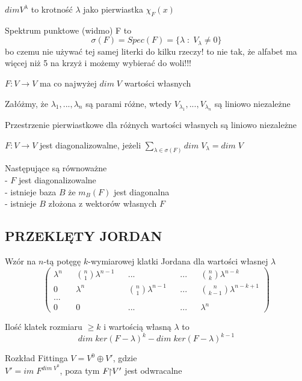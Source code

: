\documentclass{article}
\begin{document}
\begin{multicols*}{2}
    $dim V^\lambda$ to krotność $\lambda$ jako pierwiastka $\chi_F(x)$

    {\color{def}Spektrum punktowe} (widmo) F to
    $$\sigma(F)=Spec(F)=\{\lambda\;:\;V_\lambda\neq 0\}$$
    bo czemu nie używać tej samej literki do kilku rzeczy! to nie tak, że alfabet ma więcej niż 5 na krzyż i możemy wybierać do woli!!!\bigskip

    $F:V\to V$ ma co najwyżej $dim\;V$ wartości własnych\bigskip

    Załóżmy, że $\lambda_1, ..., \lambda_n$ są parami różne, wtedy $V_{\lambda_1}, ..., V_{\lambda_n}$ są liniowo niezależne\bigskip

    Przestrzenie pierwiastkowe dla różnych wartości własnych są liniowo niezależne


    $F:V\to V$ jest diagonalizowalne, jeżeli $\sum\limits_{\lambda\in\sigma(F)}dim\;V_\lambda=dim\;V$\bigskip
    
    Następujące są równoważne\smallskip\\
    \indent - $F$ jest diagonalizowalne\\
    \indent - istnieje baza $B$ że $m_B(F)$ jest diagonalna\\
    \indent - istnieje $B$ złożona z wektorów własnych $F$

    \subsection*{PRZEKLĘTY JORDAN}

    Wzór na $n$-tą potęgę $k$-wymiarowej klatki Jordana dla wartości własnej $\lambda$
    $$\begin{pmatrix}\lambda^n && {n\choose 1}\lambda ^{n-1} && ... && ... && {n\choose k}\lambda^{n-k}\\
    0 && \lambda ^ n && {n\choose 1}\lambda ^{n-1} && ... && {n\choose k-1}\lambda ^ {n-k+1}\\...\\0 && 0 && ... && ... &&\lambda ^ n\end{pmatrix}$$

    {\color{def}Ilość klatek rozmiaru} $\geq k$ i wartością własną $\lambda$ to
    $$dim\;ker(F-\lambda)^k-dim\;ker(F-\lambda)^{k-1}$$

    {\color{def}Rozkład Fittinga} $V=V^0\oplus V'$, gdzie \\$V'=im\;F^{dim\; V^0}$, poza tym $F\obet V'$ jest odwracalne



\end{multicols*}
\end{document}
